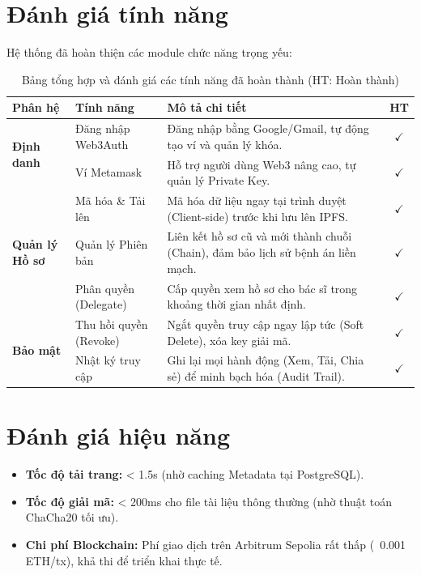 \documentclass[12pt,a4paper]{report}
\begin{document}
\section{Đánh giá tính năng}
Hệ thống đã hoàn thiện các module chức năng trọng yếu:
\begin{table}[H]
\centering
\renewcommand{\arraystretch}{1.3} %
\begin{tabular}{|p{}|p{}|p{}|c|}
\hline
\textbf{Phân hệ} & \textbf{Tính năng} & \textbf{Mô tả chi tiết} & \textbf{HT} \\ \hline
\multirow{2}{*}{\textbf{Định danh}} & Đăng nhập Web3Auth & Đăng nhập bằng Google/Gmail, tự động tạo ví và quản lý khóa. & $\checkmark$ \\ \cline{2-4} 
 & Ví Metamask & Hỗ trợ người dùng Web3 nâng cao, tự quản lý Private Key. & $\checkmark$ \\ \hline
\multirow{3}{*}{\textbf{Quản lý Hồ sơ}} & Mã hóa \& Tải lên & Mã hóa dữ liệu ngay tại trình duyệt (Client-side) trước khi lưu lên IPFS. & $\checkmark$ \\ \cline{2-4} 
 & Quản lý Phiên bản & Liên kết hồ sơ cũ và mới thành chuỗi (Chain), đảm bảo lịch sử bệnh án liền mạch. & $\checkmark$ \\ \cline{2-4} 
 & Phân quyền (Delegate) & Cấp quyền xem hồ sơ cho bác sĩ trong khoảng thời gian nhất định. & $\checkmark$ \\ \hline
\multirow{2}{*}{\textbf{Bảo mật}} & Thu hồi quyền (Revoke) & Ngắt quyền truy cập ngay lập tức (Soft Delete), xóa key giải mã. & $\checkmark$ \\ \cline{2-4} 
 & Nhật ký truy cập & Ghi lại mọi hành động (Xem, Tải, Chia sẻ) để minh bạch hóa (Audit Trail). & $\checkmark$ \\ \hline
\end{tabular}
\caption{Bảng tổng hợp và đánh giá các tính năng đã hoàn thành (HT: Hoàn thành)}
\end{table}

\section{Đánh giá hiệu năng}
\begin{itemize}
    \item \textbf{Tốc độ tải trang:} < 1.5s (nhờ caching Metadata tại PostgreSQL).
    \item \textbf{Tốc độ giải mã:} < 200ms cho file tài liệu thông thường (nhờ thuật toán ChaCha20 tối ưu).
    \item \textbf{Chi phí Blockchain:} Phí giao dịch trên Arbitrum Sepolia rất thấp (~0.001 ETH/tx), khả thi để triển khai thực tế.
\end{itemize}
\end{document}
